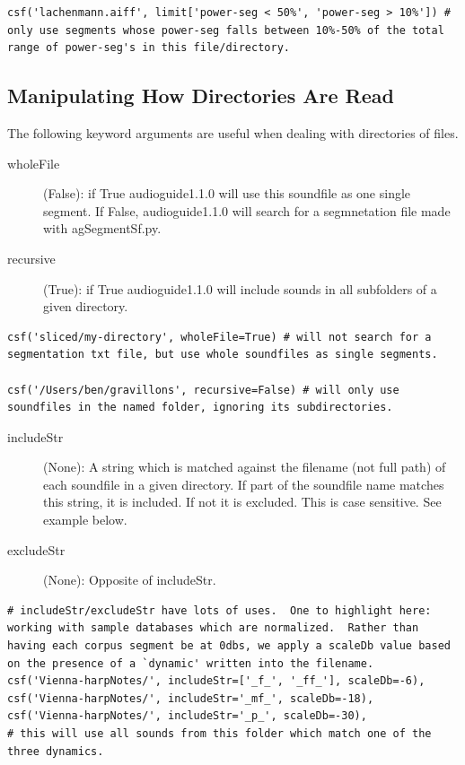 \documentclass{article}
\newcommand{\ag}{audioguide1.1.0\xspace}
\begin{document}
\begin{spacing}{1.2}
\begin{lstlisting}
csf('lachenmann.aiff', limit['power-seg < 50%', 'power-seg > 10%']) # only use segments whose power-seg falls between 10%-50% of the total range of power-seg's in this file/directory.
\end{lstlisting}



\subsection{Manipulating How Directories Are Read}
The following keyword arguments are useful when dealing with directories of files.
\begin{description}
\item[wholeFile] (False): if True \ag will use this soundfile as one single segment.  If False, \ag will search for a segmnetation file made with agSegmentSf.py.

\item[recursive] (True): if True \ag will include sounds in all subfolders of a given directory.
\end{description}

\begin{lstlisting}
csf('sliced/my-directory', wholeFile=True) # will not search for a segmentation txt file, but use whole soundfiles as single segments.

csf('/Users/ben/gravillons', recursive=False) # will only use soundfiles in the named folder, ignoring its subdirectories.
\end{lstlisting}

\begin{description}
\item[includeStr] (None): A string which is matched against the filename (not full path) of each soundfile in a given directory.  If part of the soundfile name matches this string, it is included.  If not it is excluded.  This is case sensitive.  See example below.

\item[excludeStr] (None): Opposite of includeStr.
\end{description}

\begin{lstlisting}
# includeStr/excludeStr have lots of uses.  One to highlight here: working with sample databases which are normalized.  Rather than having each corpus segment be at 0dbs, we apply a scaleDb value based on the presence of a `dynamic' written into the filename.
csf('Vienna-harpNotes/', includeStr=['_f_', '_ff_'], scaleDb=-6),
csf('Vienna-harpNotes/', includeStr='_mf_', scaleDb=-18),
csf('Vienna-harpNotes/', includeStr='_p_', scaleDb=-30),
# this will use all sounds from this folder which match one of the three dynamics.
\end{lstlisting}






\end{spacing}
\end{document}
